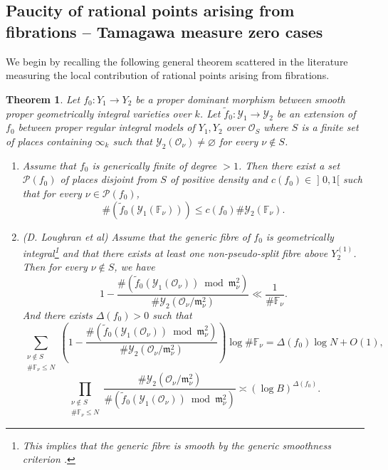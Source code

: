 \documentclass[11pt,letterpaper]{amsart}
\newcommand{\BF}{{\mathbb {F}}}
\newcommand{\CO}{{\mathcal {O}}}
\newcommand{\CP}{{\mathcal {P}}}
\newcommand{\CY}{{\mathcal {Y}}}
\theoremstyle{plain}
\numberwithin{equation}{section}
\newtheorem{theorem}{Theorem}[section]
\theoremstyle{definition}
\theoremstyle{remark}
\begin{document}
\subsection{Paucity of rational points arising from fibrations -- Tamagawa measure zero cases}\label{se:appTamagawazero}
We begin by recalling the following general theorem scattered in the literature \cite{Cohen, Serre, BBL,Browning-Loughran,Loughran-Smeets} measuring the local contribution of rational points arising from fibrations.
\begin{theorem}\label{thm:locsolfibre}
Let $f_0:Y_1\to Y_2$ be a proper dominant morphism between smooth proper geometrically integral varieties over $k$.  Let $\widetilde{f}_0:\CY_1\to\CY_2$ be an extension of $f_0$ between proper regular  integral models of $Y_1,Y_2$ over $\CO_S$ where $S$ is a finite set of places containing $\infty_k$ such that $\CY_2(\CO_{\nu})\neq\varnothing$ for every $\nu\notin S$. 
\begin{enumerate}[label=(\roman*)]
	\item  Assume that $f_0$ is generically finite of degree $>1$. Then there exist a set $\CP(f_0)$ of places disjoint from $S$ of positive density and $c(f_0)\in \mathopen]0,1[$ such that for every $\nu\in \CP(f_0)$,  \begin{equation}\label{eq:est0}
		\#\left(\widetilde{f}_0(\CY_1(\BF_\nu))\right)\leqslant c(f_0)\#\CY_2(\BF_\nu).
	\end{equation}
	\item (D. Loughran \emph{et al}) Assume that the generic fibre of $f_0$ is geometrically integral\footnote{This implies that the generic fibre is smooth by the generic smoothness criterion \cite[III. Corollary 10.7]{Hartshorne}.} and that there exists at least one non-pseudo-split fibre above $Y_2^{(1)}$.  Then for every $\nu\not\in S$, we have \begin{equation}\label{eq:esta}
	1-\frac{\#\left(\widetilde{f}_0(\CY_1(\CO_\nu))\bmod \mathfrak{m}_\nu^2\right)}{\#\CY_2(\CO_\nu/\mathfrak{m}_\nu^2)}\ll \frac{1}{\#\BF_\nu}.
\end{equation} And there exists $\varDelta(f_0)>0$ such that \begin{equation}\label{eq:est1}
			\sum_{\substack{\nu\not\in S\\ \#\BF_\nu\leqslant N}}\left(1-\frac{\#\left(\widetilde{f}_0(\CY_1(\CO_\nu))\bmod \mathfrak{m}_\nu^2\right)}{\#\CY_2(\CO_\nu/\mathfrak{m}_\nu^2)}\right)\log \#\BF_\nu =\varDelta(f_0) \log N+O(1),
		\end{equation}
		\begin{equation}\label{eq:est2}
			\prod_{\substack{\nu\not\in S\\ \#\BF_\nu\leqslant N}}\frac{\#\CY_2(\CO_\nu/\mathfrak{m}_\nu^2)}{\#\left(\widetilde{f}_0(\CY_1(\CO_\nu))\bmod \mathfrak{m}_\nu^2\right)}\asymp (\log B)^{\varDelta(f_0)}.
		\end{equation}
\end{enumerate}
\end{theorem}
\end{document}
